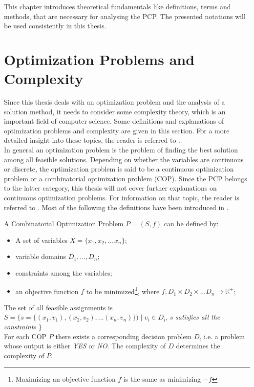 This chapter introduces theoretical fundamentals like definitions, terms and methods, that are necessary for analysing the PCP. The presented notations will be used consistently in this thesis. 
\section{Optimization Problems and Complexity}
Since this thesis deals with an optimization problem and the analysis of a solution method, it needs to consider some complexity theory, which is an important field of computer science. Some definitions and explanations of optimization problems and complexity are given in this section.
For a more detailed insight into these topics, the reader is referred to \cite{lawler-01,papadimitriou-94,garey-79}.\\
In general an optimization problem is the problem of finding the best solution among all feasible solutions. Depending on whether the variables are continuous or discrete, the optimization problem is said to be a continuous optimization problem or a combinatorial optimization problem (COP). Since the PCP belongs to the latter category, this thesis will not cover further explanations on continuous optimization problems. For information on that topic, the reader is referred to \cite{nocedal-00, pardalos-02}. Most of the following the definitions have been introduced in \cite{blum-05, neumann-10}.
\begin{definition}
A Combinatorial Optimization Problem $P = (S, f)$ can be defined by: 
\begin{itemize}
\item A set of variables $X=\{x_1,x_2,\ldots \,x_n\}$;
\item variable domains $D_1,\ldots , D_n$;
\item constraints among the variables;
\item an objective function $f$ to be minimized\footnote[1]{Maximizing an objective function $f$ is the same as minimizing $- f$}, where $f : D_1 \times D_2 \times \ldots D_n \rightarrow \mathbb{R}^+$;
\end{itemize}
\end{definition}
The set of all feasible assignments is $S = \{s=\{(x_1,v_1),(x_2,v_2),\ldots (x_n,v_n)\}) \mid v_i \in D_i$, $s$ \textit{satisfies all the constraints} $\}$\\
For each COP $P$ there exists a corresponding decision problem $D$, i.e. a problem whose output is either \textit{YES} or \textit{NO}. The complexity of $D$ determines the complexity of $P$.
